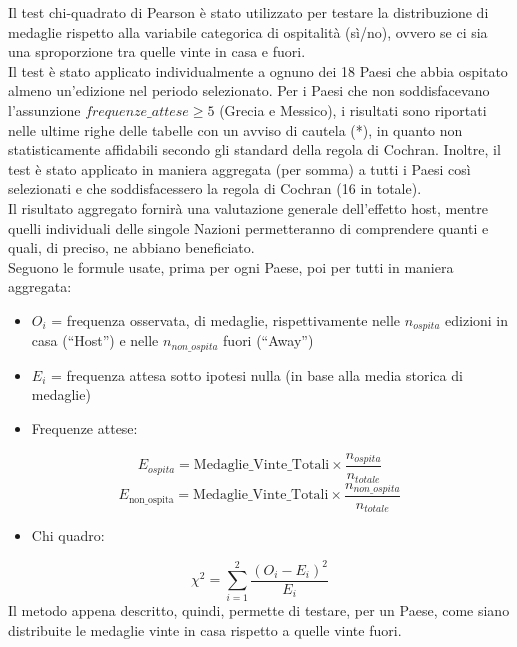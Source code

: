 
Il test chi-quadrato di Pearson è stato utilizzato per testare la distribuzione
di medaglie rispetto alla variabile categorica di ospitalità (sì/no), ovvero se
ci sia una sproporzione tra quelle vinte in casa e fuori.\\
Il test è stato applicato individualmente a ognuno dei 18 Paesi che abbia
ospitato almeno un'edizione nel periodo selezionato. Per i Paesi che non
soddisfacevano l'assunzione $\textit{frequenze\_attese} \ge 5$ (Grecia e
Messico), i risultati sono riportati nelle ultime righe delle tabelle con un
avviso di cautela (*), in quanto non statisticamente affidabili secondo gli
standard della regola di Cochran\cite{kroonenbergTaleCochransRule2018}. Inoltre,
il test è stato applicato in maniera aggregata (per somma) a tutti i Paesi così
selezionati e che soddisfacessero la regola di Cochran (16 in totale).\\
Il risultato aggregato fornirà una valutazione generale dell'effetto host,
mentre quelli individuali delle singole Nazioni permetteranno di comprendere
quanti e quali, di preciso, ne abbiano beneficiato.\\
Seguono le formule usate, prima per ogni Paese, poi per tutti in maniera
aggregata:
\begin{itemize}
	\item $O_i$ = frequenza osservata, di medaglie, rispettivamente nelle
	$n_{ospita}$ edizioni in casa (``Host'') e nelle $n_{non\_ospita}$ fuori
	(``Away'')
	\item $E_i$ = frequenza attesa sotto ipotesi nulla (in base alla media
	storica di medaglie)
	\item Frequenze attese:
\end{itemize}
\[
	E_{ospita}=\text{Medaglie\_Vinte\_Totali} \times \frac{n_{ospita}}{n_{totale}}
\]
\[
	E_{\text {non\_ospita}}=\text{Medaglie\_Vinte\_Totali} \times \frac{n_{non\_ospita}}{n_{totale}}
\]

\begin{itemize}
	\item Chi quadro:
\end{itemize}
\[
	\chi^2= \sum_{i=1}^{2} \frac{(O_i - E_i)^2}{E_{i}}
\]
Il metodo appena descritto, quindi, permette di testare, per un Paese, come siano distribuite
le medaglie vinte in casa rispetto a quelle vinte fuori.\\

